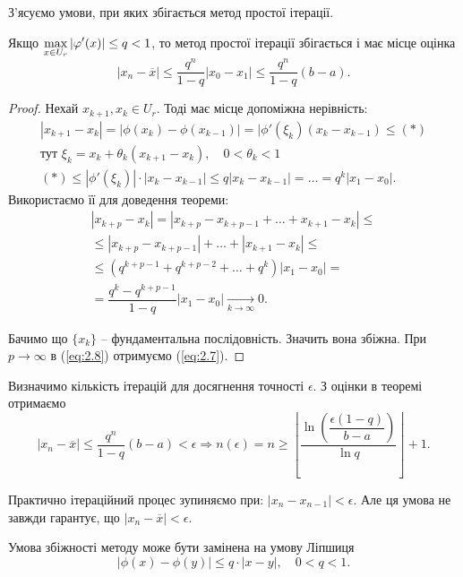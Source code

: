 З'ясуємо умови, при яких збігається метод простої ітерації.

\begin{theorem}
	Якщо $\displaystyle\max\limits_{x \in U_r} |\varphi'(x)| \le q < 1$, то метод простої ітерації збігається і має місце оцінка 
	\begin{equation}
		\label{eq:2.7}
		|x_n - \overline{x}| \le \dfrac{q^n}{1-q}|x_0-x_1| \le \dfrac{q^n}{1-q}(b-a).
	\end{equation}
\end{theorem}

\begin{proof}
	Нехай $x_{k+1}, x_k \in U_r$. Тоді має місце допоміжна нерівність:
	\begin{multline*}
		|x_{k+1} - x_k| = |\phi(x_k) - \phi(x_{k-1})| = |\phi'(\xi_k)(x_k - x_{k-1}) \le (*) \\
		\text{тут }\xi_k = x_k + \theta_k (x_{k+1} - x_k), \quad 0 < \theta_k < 1 \\
		(*) \le |\phi'(\xi_k)| \cdot |x_k - x_{k-1}| \le q |x_k - x_{k-1}| = \ldots = q^k |x_1 - x_0|.
	\end{multline*}
	Використаємо її для доведення теореми:
	\begin{multline}
		\label{eq:2.8}
		|x_{k+p} - x_k| = |x_{k+p} - x_{k+p-1} + \ldots + x_{k+1} - x_k| \le \\
		\le |x_{k+p} - x_{k+p-1}| + \ldots + |x_{k+1} - x_k| \le \\
		\le (q^{k+p-1}+q^{k+p-2}+\ldots+q^k) |x_1 - x_0| = \\
		= \dfrac{q^k - q^{k+p-1}}{1-q}|x_1-x_0| \xrightarrow[k\to\infty]{}0.
	\end{multline}

	Бачимо що $\{x_k\}$ -- фундаментальна послідовність. Значить вона збіжна. При $p\to\infty$ в (\ref{eq:2.8}) отримуємо (\ref{eq:2.7}).
\end{proof}

Визначимо кількість ітерацій для досягнення точності $\epsilon$. З оцінки в теоремі отримаємо \[ |x_n - \overline{x}| \le \dfrac{q^n}{1-q}(b-a) < \epsilon \Rightarrow n(\epsilon) = n \ge \left\lfloor \dfrac{\ln \left(\dfrac{\epsilon (1-q)}{b - a}\right)}{\ln q} \right\rfloor + 1. \]

Практично ітераційний процес зупиняємо при: $|x_n - x_{n-1}| < \epsilon$. Але ця умова не завжди гарантує, що $|x_n - \overline{x}| < \epsilon$.

\begin{remark*}
	Умова збіжності методу може бути замінена на умову Ліпшиця \[|\phi(x) -\phi(y)| \le q \cdot| x - y |,\quad 0 < q < 1.\]
\end{remark*}

